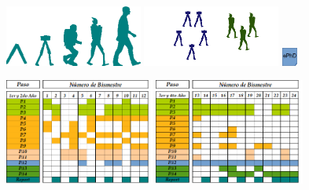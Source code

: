 {\begin{frame}[label=simulacion_cronograma]
\begin{center}
{        \includegraphics[height=2.0cm]{../images/EvolutionFramework_10.png}
        \includegraphics[height=2.0cm]{../images/EvolutionFramework_12.png}
        \includegraphics[height=0.6cm]{../images/PhDLogo.png}

        \includegraphics[height=3.5cm]{../images/Cronograma_17.png}
        \includegraphics[height=3.5cm]{../images/Cronograma_29.png}
      }
    \end{center}
  \end{frame}
}
